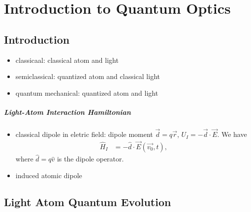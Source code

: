 \documentclass[../../note.tex]{subfiles}
\begin{document}

\chapter{Introduction to Quantum Optics}
\section{Introduction}
\begin{itemize}
    \item classicaal: classical atom and light
    \item semiclassical: quantized atom and classical light
    \item quantum mechanical: quantized atom and light
\end{itemize}

\paragraph{Light-Atom Interaction Hamiltonian}
\begin{itemize}
    \item classical dipole in eletric field: dipole moment $\overrightarrow{d} = q \overrightarrow{r}$, $U_I = - \overrightarrow{d} \cdot \overrightarrow{E}$. We have 
    \begin{align}
        \hat{H}_I 
        &= - \hat{d} \cdot \overrightarrow{E}(\overrightarrow{v_0}, t),
    \end{align}
    where $\hat{d} = q \hat{v}$ is the dipole operator.
    \item induced atomic dipole
\end{itemize}

\section{Light Atom Quantum Evolution}
\end{document}
